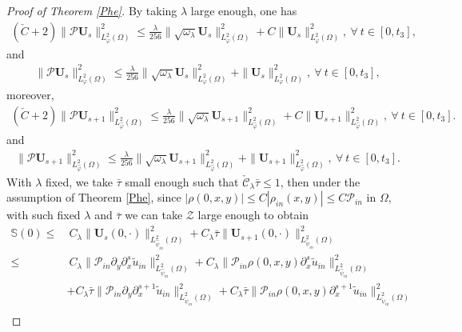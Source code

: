 \documentclass[10pt,a4paper]{amsart}
\begin{document}
\begin{proof}[Proof of Theorem \ref{Phe}]
By taking $\lambda$ large enough, one has
\begin{align*}
(\check{C}+2)\|\mathcal{P}\mathbf{U}_{s}\|_{L_{\varphi}^{2}(\Omega)}^{2}
\leq \frac{\lambda}{256}\|\sqrt{\omega_{\lambda}}\mathbf{U}_{s}\|_{L_{\varphi}^{2}(\Omega)}^{2}
    +C\|\mathbf{U}_{s}\|_{L_{\varphi}^{2}(\Omega)}^{2},~\forall~t\in[0,t_{3}],
\end{align*}
and
\begin{align}\label{pus}
\|\mathcal{P}\mathbf{U}_{s}\|_{L_{\varphi}^{2}(\Omega)}^{2}
\leq \frac{\lambda}{256}\|\sqrt{\omega_{\lambda}}\mathbf{U}_{s}\|_{L_{\varphi}^{2}(\Omega)}^{2}
    +\|\mathbf{U}_{s}\|_{L_{\varphi}^{2}(\Omega)}^{2},   ~\forall~t\in[0,t_{3}],
\end{align}
moreover,
\begin{align*}
(\check{C}+2)\|\mathcal{P}\mathbf{U}_{s+1}\|_{L_{\hat{\varphi}}^{2}(\Omega)}^{2}
\leq \frac{\lambda}{256}\|\sqrt{\omega_{\lambda}}\mathbf{U}_{s+1}\|_{L_{\hat{\varphi}}^{2}(\Omega)}^{2}
    +C\|\mathbf{U}_{s+1}\|_{L_{\hat{\varphi}}^{2}(\Omega)}^{2},~\forall~t\in[0,t_{3}].
\end{align*}
and
\begin{align}\label{pus+1}
\|\mathcal{P}\mathbf{U}_{s+1}\|_{L_{\hat{\varphi}}^{2}(\Omega)}^{2}
\leq \frac{\lambda}{256}\|\sqrt{\omega_{\lambda}}\mathbf{U}_{s+1}\|_{L_{\hat{\varphi}}^{2}(\Omega)}^{2}
    +\|\mathbf{U}_{s+1}\|_{L_{\hat{\varphi}}^{2}(\Omega)}^{2},~\forall~t\in[0,t_{3}].
\end{align}
With $\lambda$ fixed, we take $\bar{\tau}$ small enough such that $\check{\mathcal{C}}_{\lambda}\bar{\tau}\leq1$, then under the assumption of Theorem \ref{Phe}, since $|\rho(0,x,y)|\leq C|\rho_{in}(x,y)|\leq C\mathcal{P}_{in}$ in $\Omega$, with such fixed $\lambda$ and $\bar{\tau}$ we can take $\mathcal{Z}$ large enough to obtain
\begin{align}\label{ine}
\mathbb{S}(0)
\leq&~C_{\lambda}\|\mathbf{U}_{s}(0,\cdot)\|_{L_{\hat{\psi}_{in}}^{2}(\Omega)}^{2}
     +C_{\lambda}\bar{\tau}\|\mathbf{U}_{s+1}(0,\cdot)\|_{L_{\check{\psi}_{in}}^{2}(\Omega)}^{2}\\
\leq&~C_{\lambda}\|\mathcal{P}_{in}\partial_{y}\partial_{x}^{s}\tilde{u}_{in}\|_{L_{\hat{\psi}_{in}}^{2}(\Omega)}^{2}
     +C_{\lambda}\|\mathcal{P}_{in}\rho(0,x,y)\partial_{x}^{s}\tilde{u}_{in}\|_{L_{\hat{\psi}_{in}}^{2}(\Omega)}^{2}\nonumber\\
    &+C_{\lambda}\bar{\tau}\|\mathcal{P}_{in}\partial_{y}\partial_{x}^{s+1}\tilde{u}_{in}\|_{L_{\check{\psi}_{in}}^{2}(\Omega)}^{2}
     +C_{\lambda}\bar{\tau}\|\mathcal{P}_{in}\rho(0,x,y)\partial_{x}^{s+1}\tilde{u}_{in}\|_{L_{\check{\psi}_{in}}^{2}(\Omega)}^{2}\nonumber\\

\end{align}
\end{proof}
\end{document}
